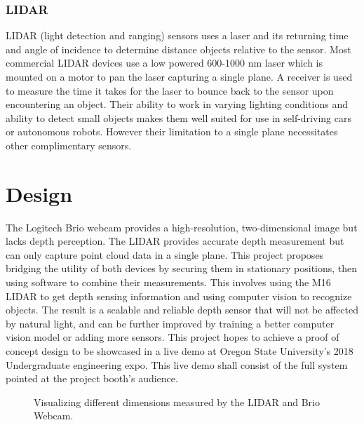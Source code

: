 \documentclass{article}
\begin{document}
    \subsubsection{LIDAR}
      LIDAR (light detection and ranging) sensors uses a laser and its returning time and angle of incidence to determine distance objects relative to the sensor. 
      Most commercial LIDAR devices use a low powered 600-1000 nm laser which is mounted on a motor to pan the laser capturing a single plane.
      A receiver is used to measure the time it takes for the laser to bounce back to the sensor upon encountering an object.
      Their ability to work in varying lighting conditions and ability to detect small objects makes them well suited for use in self-driving cars or autonomous robots. 
      However their limitation to a single plane necessitates other complimentary sensors.

\section{Design}
\label{sec:Design}
  The Logitech Brio webcam provides a high-resolution, two-dimensional image but lacks depth perception.
  The LIDAR provides accurate depth measurement but can only capture point cloud data in a single plane.
  This project proposes bridging the utility of both devices by securing them in stationary positions, then using software to combine their measurements.
  This involves using the M16 LIDAR to get depth sensing information and using computer vision to recognize objects.
  The result is a scalable and reliable depth sensor that will not be affected by natural light, and can be further improved by training a better computer vision model or adding more sensors.
  This project hopes to achieve a proof of concept design to be showcased in a live demo at Oregon State University's 2018 Undergraduate engineering expo.			
  This live demo shall consist of the full system pointed at the project booth's audience. 



  \begin{figure}[h]
    \centering
    \caption{Visualizing different dimensions measured by the LIDAR and Brio Webcam.}
    \label{fig:differentDimensions}
  \end{figure}
\end{document}
